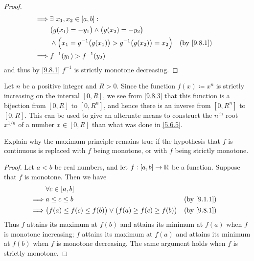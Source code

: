 \begin{proof}
\begin{align*}
    \implies & \exists\ x_1, x_2 \in [a, b] :                                                                          \\
             & \big(g(x_1) = -y_1\big) \land \big(g(x_2) = -y_2\big)                                                   \\
             & \land \Big(x_1 = g^{-1}\big(g(x_1)\big) > g^{-1}\big(g(x_2)\big) = x_2\Big)             &  & \by{9.8.1} \\
    \implies & f^{-1}(y_1) > f^{-1}(y_2)
  \end{align*}
  and thus by \cref{9.8.1} \(f^{-1}\) is strictly monotone decreasing.
\end{proof}

\begin{eg}\label{9.8.4}
  Let \(n\) be a positive integer and \(R > 0\).
  Since the function \(f(x) \coloneqq x^n\) is strictly increasing on the interval \([0, R]\), we see from \cref{9.8.3} that this function is a bijection from \([0, R]\) to \([0, R^n]\), and hence there is an inverse from \([0, R^n]\) to \([0, R]\).
  This can be used to give an alternate means to construct the \(n^\text{th}\) root \(x^{1 / n}\) of a number \(x \in [0, R]\) than what was done in \cref{5.6.5}.
\end{eg}

\exercisesection

\begin{ex}\label{ex:9.8.1}
  Explain why the maximum principle remains true if the hypothesis that \(f\) is continuous is replaced with \(f\) being monotone, or with \(f\) being strictly monotone.
\end{ex}

\begin{proof}
  Let \(a < b\) be real numbers, and let \(f : [a, b] \to \mathbb{R}\) be a function.
  Suppose that \(f\) is monotone.
  Then we have
  \begin{align*}
             & \forall c \in [a, b]                                                                       \\
    \implies & a \leq c \leq b                                                            &  & \by{9.1.1} \\
    \implies & \big(f(a) \leq f(c) \leq f(b)\big) \lor \big(f(a) \geq f(c) \geq f(b)\big) &  & \by{9.8.1} \\
  \end{align*}
  Thus \(f\) attains its maximum at \(f(b)\) and attains its minimum at \(f(a)\) when \(f\) is monotone increasing;
  \(f\) attains its maximum at \(f(a)\) and attains its minimum at \(f(b)\) when \(f\) is monotone decreasing.
  The same argument holds when \(f\) is strictly monotone.
\end{proof}

